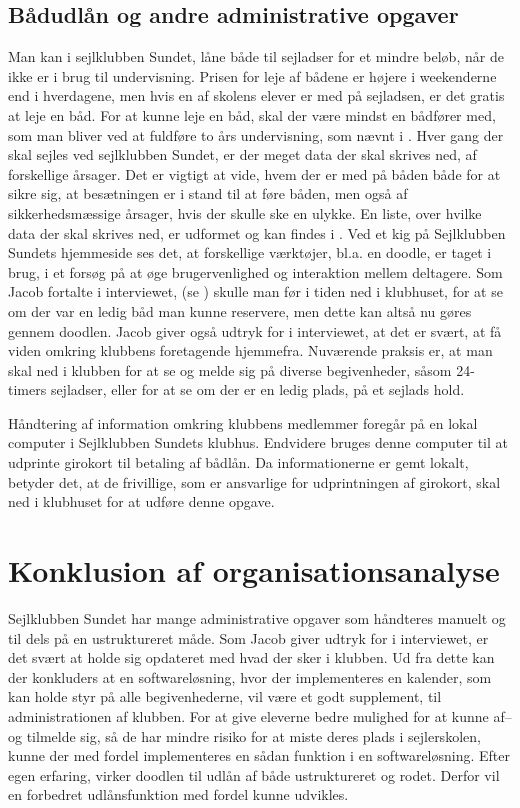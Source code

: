 \subsection{Bådudlån og andre administrative opgaver}\label{subsec:bådudlån}

Man kan i sejlklubben Sundet, låne både til sejladser for et mindre beløb, når de ikke er i brug til
undervisning. Prisen for leje af bådene er højere i weekenderne end i hverdagene, men hvis en af skolens
elever er med på sejladsen, er det gratis at leje en båd. For at kunne leje en båd, skal der være mindst en
bådfører med, som man bliver ved at fuldføre to års undervisning, som nævnt i 
\citep{Sundet}. Hver gang der skal sejles ved sejlklubben Sundet, er der meget data der skal skrives ned, af
forskellige årsager. Det er vigtigt at vide, hvem der er med på båden både for at sikre sig, at besætningen er
i stand til at føre båden, men også af sikkerhedsmæssige årsager, hvis der skulle ske en ulykke. En liste,
over hvilke data der skal skrives ned, er udformet og kan findes i . Ved et kig på
Sejlklubben Sundets hjemmeside \citep{SundetUdlaan} ses det, at forskellige værktøjer, bl.a. en doodle, er
taget i brug, i et forsøg på at øge brugervenlighed og interaktion mellem deltagere. Som Jacob fortalte i
interviewet, (se ) skulle man før i tiden ned i klubhuset, for at se om der var en
ledig båd man kunne reservere, men dette kan altså nu gøres gennem doodlen. Jacob giver også udtryk for i
interviewet, at det er svært, at få viden omkring klubbens foretagende hjemmefra. Nuværende praksis er, at man
skal ned i klubben for at se og melde sig på diverse begivenheder, såsom 24-timers sejladser, eller for at se
om der er en ledig plads, på et sejlads hold.

Håndtering af information omkring klubbens medlemmer foregår på en lokal computer i Sejlklubben Sundets
klubhus. Endvidere bruges denne computer til at udprinte girokort til betaling af bådlån. Da informationerne
er gemt lokalt, betyder det, at de frivillige, som er ansvarlige for udprintningen af girokort, skal ned i
klubhuset for at udføre denne opgave.


\section{Konklusion af organisationsanalyse}\label{sec:organisation-konklusion}

Sejlklubben Sundet har mange administrative opgaver som håndteres manuelt og til dels på en ustruktureret
måde. Som Jacob giver udtryk for i interviewet, er det svært at holde sig opdateret med hvad der sker i
klubben. Ud fra dette kan der konkluders at en softwareløsning, hvor der implementeres en kalender, som kan
holde styr på alle begivenhederne, vil være et godt supplement, til administrationen af klubben. For at give
eleverne bedre mulighed for at kunne af-- og tilmelde sig, så de har mindre risiko for at miste deres plads i
sejlerskolen, kunne der med fordel implementeres en sådan funktion i en softwareløsning. Efter egen erfaring,
virker doodlen til udlån af både ustruktureret og rodet. Derfor vil en forbedret udlånsfunktion med fordel
kunne udvikles.

